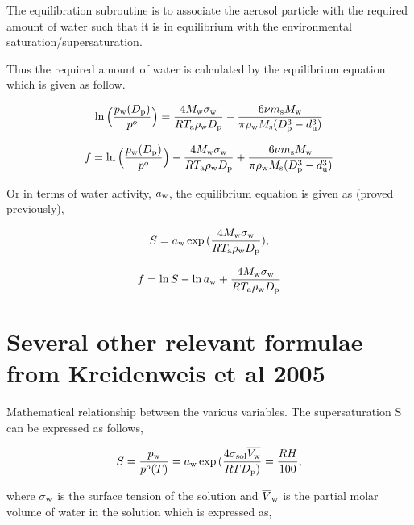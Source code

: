 \documentclass[12pt]{article}
\begin{document}
{The equilibration subroutine is to associate the aerosol particle with the required amount of water such that it is in equilibrium with the environmental saturation/supersaturation.

Thus the required amount of water is calculated by the equilibrium equation which is given as follow.

\begin{equation}\label{eqn:A11}
\ln{\Big(\frac{p_{\rm w}(D_{\rm p})}{p^{o}}\Big)}=\frac{4 M_{\rm w} \sigma_{\rm w}}{R T_{\rm a} \rho_{\rm w} D_{\rm p}}-\frac{6 \nu m_{\rm s} M_{\rm w}}{\pi \rho_{\rm w} M_{\rm s}(D_{\rm p}^{3}-d_{\rm u}^{3})}
\end{equation}

\begin{equation}\label{eqn:A12}
f=\ln{\Big(\frac{p_{\rm w}(D_{\rm p})}{p^{o}}\Big)}-\frac{4 M_{\rm w} \sigma_{\rm w}}{R T_{\rm a} \rho_{\rm w} D_{\rm p}}+\frac{6 \nu m_{\rm s} M_{\rm w}}{\pi \rho_{\rm w} M_{\rm s}(D_{\rm p}^{3}-d_{\rm u}^{3})}
\end{equation}

Or in terms of water activity, $a_{\rm w}$, the equilibrium equation is given as (proved previously), 

\begin{equation}\label{eqn:A13}
S=a_{\rm w}\exp{(\frac{4 M_{\rm w} \sigma_{\rm w}}{R T_{\rm a} \rho_{\rm w}D_{\rm p}})}, 
\end{equation}

\begin{equation}\label{eqn:A14}
f=\ln{S}-\ln{a_{\rm w}}+\frac{4 M_{\rm w} \sigma_{\rm w}}{R T_{\rm a} \rho_{\rm w} D_{\rm p}}
\end{equation}


\section{Several other relevant formulae from Kreidenweis et al 2005}

Mathematical relationship between the various variables. The supersaturation S can be expressed as follows,

\begin{equation}
S=\frac{p_{\rm w}}{p^{o}(T)}=a_{\rm w} \exp {(\frac{4 \sigma_{\rm sol} \overline{V_{\rm w}}} {RT D_{\rm p} ) } }= \frac {RH}{100},
\end{equation}

where $\sigma_{\rm w}$ is the surface tension of the solution and $\overline V_{\rm w}$ is the partial molar volume of water in the solution which is expressed as, 

}
\end{document}
